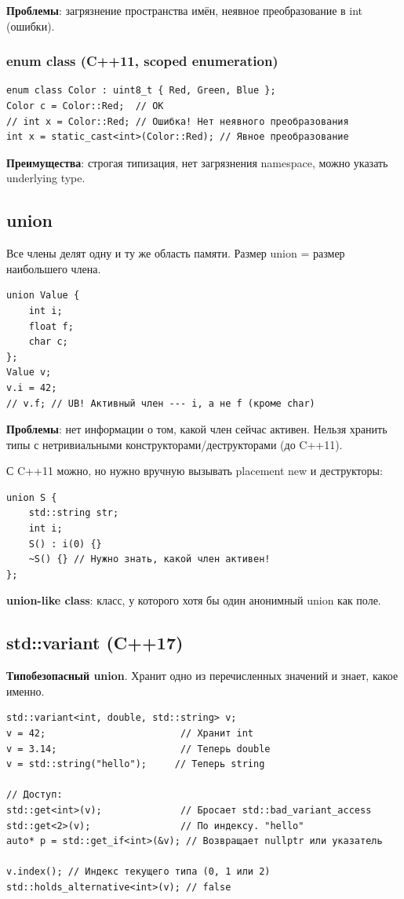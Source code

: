 \documentclass[12pt,a4paper]{article}
\begin{document}
\textbf{Проблемы}: загрязнение пространства имён, неявное преобразование в int (ошибки).

\subsubsection{enum class (C++11, scoped enumeration)}
\begin{lstlisting}
enum class Color : uint8_t { Red, Green, Blue };
Color c = Color::Red;  // OK
// int x = Color::Red; // Ошибка! Нет неявного преобразования
int x = static_cast<int>(Color::Red); // Явное преобразование
\end{lstlisting}

\textbf{Преимущества}: строгая типизация, нет загрязнения namespace, можно указать underlying type.

\subsection{union}

Все члены делят одну и ту же область памяти. Размер union = размер наибольшего члена.
\begin{lstlisting}
union Value {
    int i;
    float f;
    char c;
};
Value v;
v.i = 42;
// v.f; // UB! Активный член --- i, а не f (кроме char)
\end{lstlisting}

\textbf{Проблемы}: нет информации о том, какой член сейчас активен. Нельзя хранить типы с нетривиальными конструкторами/деструкторами (до C++11).

С C++11 можно, но нужно вручную вызывать placement new и деструкторы:
\begin{lstlisting}
union S {
    std::string str;
    int i;
    S() : i(0) {}
    ~S() {} // Нужно знать, какой член активен!
};
\end{lstlisting}

\textbf{union-like class}: класс, у которого хотя бы один анонимный union как поле.

\subsection{std::variant (C++17)}

\textbf{Типобезопасный union}. Хранит одно из перечисленных значений и знает, какое именно.
\begin{lstlisting}
std::variant<int, double, std::string> v;
v = 42;                        // Хранит int
v = 3.14;                      // Теперь double
v = std::string("hello");     // Теперь string

// Доступ:
std::get<int>(v);              // Бросает std::bad_variant_access
std::get<2>(v);                // По индексу. "hello"
auto* p = std::get_if<int>(&v); // Возвращает nullptr или указатель

v.index(); // Индекс текущего типа (0, 1 или 2)
std::holds_alternative<int>(v); // false
\end{lstlisting}
\end{document}
